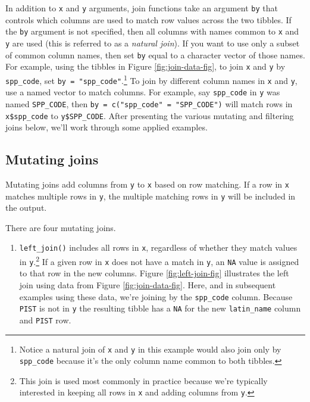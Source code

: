 \documentclass[
  11pt,
]{krantz}
\providecommand{\tightlist}{%
  \setlength{\itemsep}{0pt}\setlength{\parskip}{0pt}}
\theoremstyle{definition}
\theoremstyle{definition}
\theoremstyle{definition}
\theoremstyle{definition}
\theoremstyle{remark}
\begin{document}
In addition to \texttt{x} and \texttt{y} arguments, join functions take an argument \texttt{by} that controls which columns are used to match row values across the two tibbles. If the \texttt{by} argument is not specified, then all columns with names common to \texttt{x} and \texttt{y} are used (this is referred to as a \emph{natural join}). If you want to use only a subset of common column names, then set \texttt{by} equal to a character vector of those names. For example, using the tibbles in Figure \ref{fig:join-data-fig}, to join \texttt{x} and \texttt{y} by \texttt{spp\_code}, set \texttt{by\ =\ "spp\_code"}.\footnote{Notice a natural join of \texttt{x} and \texttt{y} in this example would also join only by \texttt{spp\_code} because it's the only column name common to both tibbles.} To join by different column names in \texttt{x} and \texttt{y}, use a named vector to match columns. For example, say \texttt{spp\_code} in \texttt{y} was named \texttt{SPP\_CODE}, then \texttt{by\ =\ c("spp\_code"\ =\ "SPP\_CODE")} will match rows in \texttt{x\$spp\_code} to \texttt{y\$SPP\_CODE}. After presenting the various mutating and filtering joins below, we'll work through some applied examples.

\hypertarget{mutatingJoins}{%
\subsection{Mutating joins}\label{mutatingJoins}}

Mutating joins add columns from \texttt{y} to \texttt{x} based on row matching. If a row in \texttt{x} matches multiple rows in \texttt{y}, the multiple matching rows in \texttt{y} will be included in the output.

There are four mutating joins.

\begin{enumerate}
\def\labelenumi{\arabic{enumi}.}
\tightlist
\item
  \texttt{left\_join()} includes all rows in \texttt{x}, regardless of whether they match values in \texttt{y}.\footnote{This join is used most commonly in practice because we're typically interested in keeping all rows in \texttt{x} and adding columns from \texttt{y}.} If a given row in \texttt{x} does not have a match in \texttt{y}, an \texttt{NA} value is assigned to that row in the new columns. Figure \ref{fig:left-join-fig} illustrates the left join using data from Figure \ref{fig:join-data-fig}. Here, and in subsequent examples using these data, we're joining by the \texttt{spp\_code} column. Because \texttt{PIST} is not in \texttt{y} the resulting tibble has a \texttt{NA} for the new \texttt{latin\_name} column and \texttt{PIST} row.
\end{enumerate}
\end{document}

